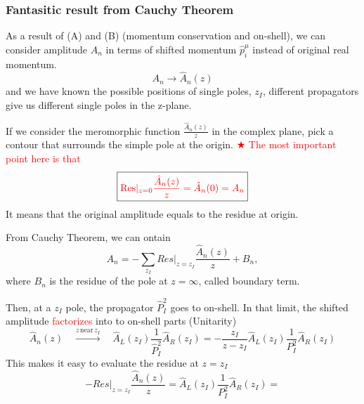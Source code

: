\documentclass{beamer}
\begin{document}
\begin{frame}
    \frametitle{Fantasitic result from Cauchy Theorem}
    As a result of (A) and (B) (momentum conservation and on-shell), we can consider amplitude $A_n$ in terms of shifted momentum $\hat{p}_i^\mu$ instead of
    original real momentum. 
    \begin{equation*}
        A_n \longrightarrow \hat{A}_n(z)
    \end{equation*}
    and we have known the possible positions of single poles, $z_I$, different propagators give 
    us different single poles in the z-plane. 
    \par
    If we consider the meromorphic function $\frac{\hat{A}_n(z)}{z}$ in the complex plane, pick a contour that surrounds the simple pole at the origin. 
    \textcolor{red}{$\bigstar$ The most important point here is that}
    \begin{equation*}
        \boxed{\color{red}\mathrm{Res}|_{z=0}\frac{\hat{A}_n(z)}{z}=\hat{A}_n(0)=A_n}
    \end{equation*}
    It means that the original amplitude equals to the residue at origin.
\end{frame}
\begin{frame}
    From Cauchy Theorem, we can ontain
    \begin{equation*}
        A_n=-\sum_{z_I}Res|_{z=z_I}\frac{\hat{A}_n(z)}{z}+B_n,
    \end{equation*}
    where $B_n$ is the residue of the pole at $z=\infty$, called boundary term.

    Then, at a $z_I$ pole, the propagator $\hat{P}_I^2$ goes to on-shell. In that limit, the shifted amplitude
    \textcolor{red}{factorizes} into to on-shell parts (Unitarity)
    \begin{equation*}
        \hat{A}_n(z)\quad \xrightarrow{z\,\text{near}\,z_I} \quad \hat{A}_L(z_I)\frac{1}{\hat{P}_I^2}\hat{A}_R(z_I)= - \frac{z_I}{z-z_I}\hat{A}_L(z_I)\frac{1}{P_I^2}\hat{A}_R(z_I)
    \end{equation*}
    This makes it easy to evaluate the residue at $z=z_I$
    \begin{equation*}
        -Res|_{z=z_I}\frac{\hat{A}_n(z)}{z}=\hat{A}_L(z_I)\frac{1}{P_I^2}\hat{A}_R(z_I)=
    \end{equation*}
\end{frame}
\end{document}

